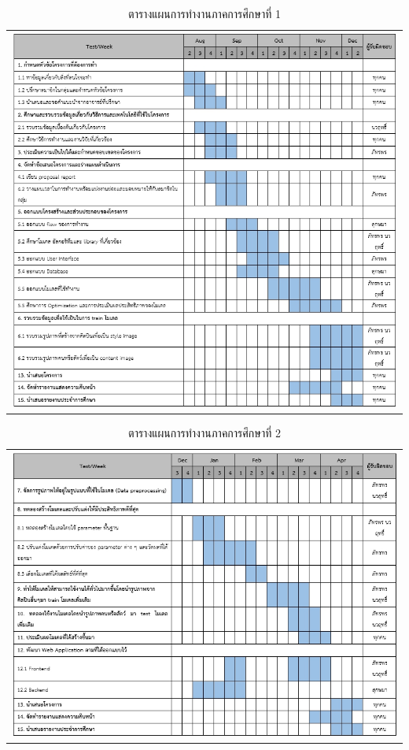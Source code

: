 \documentclass[12pt,oneside,openright,a4paper]{cpe-thai-project}
\begin{document}
\newpage

\begin{table}[!h]
  \centering
  \begin{tabular}{c}
  \hfill
  \includegraphics[width=15cm]{./image/plan_table1.jpg}
  \hfill
  \end{tabular}
\caption{ตารางแผนการทำงานภาคการศึกษาที่ 1\centering}
\label{tbl:symbols1}
\end{table}

\newpage

\begin{table}[!h]
  \centering
  \begin{tabular}{c}
  \hfill
  \includegraphics[width=15cm]{./image/plan_table2.jpg}
  \hfill
  \end{tabular}
\caption{ตารางแผนการทำงานภาคการศึกษาที่ 2\centering}
\label{tbl:symbols2}
\end{table}
\end{document}
